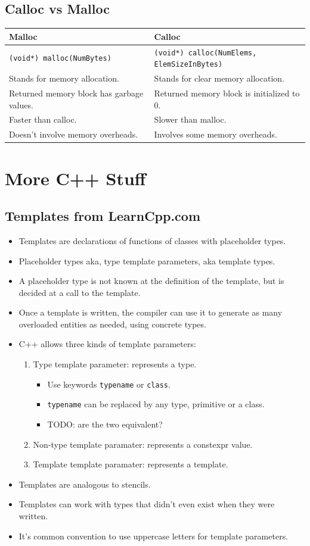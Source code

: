\documentclass{report}
\newcommand{\trow}[2]{\hline #1 & #2 \\}
\begin{document}
\section{Calloc vs Malloc}
\begin{center}
\begin{tabular}{| p{8cm} | p{8cm} |}
    \trow{Malloc}{Calloc}
    \trow{\texttt{(void*) malloc(NumBytes)}}{\texttt{(void*) calloc(NumElems, ElemSizeInBytes)}}
    \trow{Stands for memory allocation.}{Stands for clear memory allocation.}
    \trow{Returned memory block has garbage values.}{Returned memory block is initialized to 0.}
    \trow{Faster than calloc.}{Slower than malloc.}
    \trow{Doesn't involve memory overheads.}{Involves some memory overheads.}
    \hline
\end{tabular}
\end{center}
\chapter{More C++ Stuff}
\section{Templates from LearnCpp.com}
\begin{itemize}
\item Templates are declarations of functions of classes with placeholder types.
\item Placeholder types aka, type template parameters, aka template types.
\item A placeholder type is not known at the definition of the template, but is decided at a call to the template.
\item Once a template is written, the compiler can use it to generate as many overloaded entities as needed, using concrete types.
\item C++ allows three kinds of template parameters:
\begin{enumerate}
    \item Type template parameter: represents a type.
    \begin{itemize}
        \item Use keywords \texttt{typename} or \texttt{class}.
        \item \texttt{typename} can be replaced by any type, primitive or a class.
        \item TODO: are the two equivalent?
    \end{itemize}
    \item Non-type template paramater: represents a constexpr value.
    \item Template template paramater: represents a template.
\end{enumerate}
\item Templates are analogous to stencils.
\item Templates can work with types that didn't even exist when they were written.
\item It's common convention to use uppercase letters for template parameters.
\end{itemize}
\end{document}
